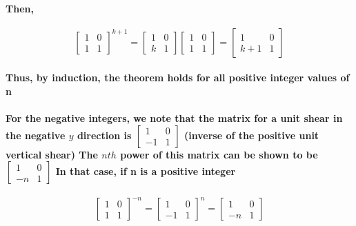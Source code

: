 \documentclass{report}
\begin{document}
\paragraph{Then,}

\begin{equation}
\begin{bmatrix}
1&0\\1&1
\end{bmatrix}^{k+1}
=
\begin{bmatrix}
1&0\\k&1
\end{bmatrix}
\begin{bmatrix}
1&0\\1&1
\end{bmatrix}
=
\begin{bmatrix}
1&0\\k+1&1
\end{bmatrix}
\end{equation}

\paragraph{Thus, by induction, the theorem holds for all positive integer values of n}

\paragraph{For the negative integers, we note that the matrix for a unit shear in the negative $y$ direction is 
$\begin{bmatrix}
1&0\\-1&1
\end{bmatrix}$
(inverse of the positive unit vertical shear) The $nth$ power of this matrix can be shown to be 
$\begin{bmatrix}
1&0\\-n&1
\end{bmatrix}$
In that case, if n is a positive integer}

\begin{equation}
\begin{bmatrix}
1&0\\1&1
\end{bmatrix}^{-n}
=
\begin{bmatrix}
1&0\\-1&1
\end{bmatrix}^n
=
\begin{bmatrix}
1&0\\-n&1
\end{bmatrix}
\end{equation}
\end{document}
